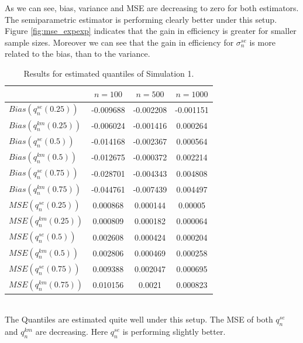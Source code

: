 %
As we can see, bias, variance and MSE are decreasing to zero for both estimators. The semiparametric estimator is performing clearly better under this setup. Figure \ref{fig:mse_expexp} indicates that the gain in efficiency is greater for smaller sample sizes. Moreover we can see that the gain in efficiency for $\sigma_{n}^{se}$ is more related to the bias, than to the variance. 
\begin{table}[h!]
	\begin{center}
		\begin{tabular}{| l || c | c | c |}
			\hline
			&       $n=100$   &    $n=500$    &    $n=1000$\\
			\hline
			\hline
			$Bias(q^{se}_n(0.25)) $  & -0.009688 & -0.002208 & -0.001151\\
			$Bias(q^{km}_n(0.25)) $  & -0.006024 & -0.001416 & 0.000264\\
			\hline
			$Bias(q^{se}_n(0.5)) $  & -0.014168 & -0.002367 & 0.000564\\
			$Bias(q^{km}_n(0.5))$  & -0.012675 & -0.000372 & 0.002214\\
			\hline
			$Bias(q^{se}_n(0.75))$  & -0.028701 & -0.004343 & 0.004808\\
			$Bias(q^{km}_n(0.75))$  & -0.044761 & -0.007439 & 0.004497\\
			\hline
			\hline
			$MSE(q^{se}_n(0.25))$  & 0.000868 & 0.000144 & 0.00005\\
			$MSE(q^{km}_n(0.25))$  & 0.000809 & 0.000182 & 0.000064\\
			\hline
			$MSE(q^{se}_n(0.5))$  & 0.002608 & 0.000424 & 0.000204\\
			$MSE(q^{km}_n(0.5))$  & 0.002806 & 0.000469 & 0.000258\\
			\hline
			$MSE(q^{se}_n(0.75))$  & 0.009388 & 0.002047 & 0.000695\\
			$MSE(q^{km}_n(0.75))$  & 0.010156 & 0.0021 & 0.000823\\
			\hline
		\end{tabular}
	\end{center}
	\caption{Results for estimated quantiles of Simulation 1.}
	\label{tab:res_expexp2}
\end{table}
\\
The Quantiles are estimated quite well under this setup. The MSE of both $q_{n}^{se}$ and $q_{n}^{km}$ are decreasing. Here $q_{n}^{se}$ is performing slightly better.
